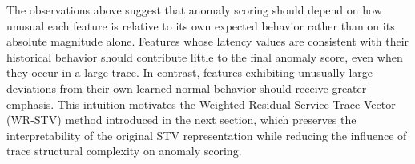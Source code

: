 The observations above suggest that anomaly scoring should depend on how
unusual each feature is relative to its own expected behavior rather
than on its absolute magnitude alone. Features whose latency values are
consistent with their historical behavior should contribute little to the
final anomaly score, even when they occur in a large trace. In contrast,
features exhibiting unusually large deviations from their own learned
normal behavior should receive greater emphasis. This intuition motivates
the Weighted Residual Service Trace Vector (WR-STV) method introduced in
the next section, which preserves the interpretability of the original
STV representation while reducing the influence of trace structural
complexity on anomaly scoring.